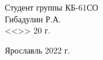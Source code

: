 \begin{titlepage}
\begin{minipage}{0.45\textwidth}
    \end{minipage}%
    \vfill
    
    \hfill\begin{minipage}{0.45\textwidth}
        \begin{flushright}
            Студент группы КБ-61СО \\
            \underline{\hspace{2.5cm}} Гибадулин Р.А.\\
            <<\underline{\hspace{1cm}}>> \underline{\hspace{2cm}} 20\underline{\hspace{1cm}} г.
        \end{flushright}
    \end{minipage}%
    \vfill
    
    \begin{center}
        Ярославль 2022 г.
    \end{center}
\end{titlepage}